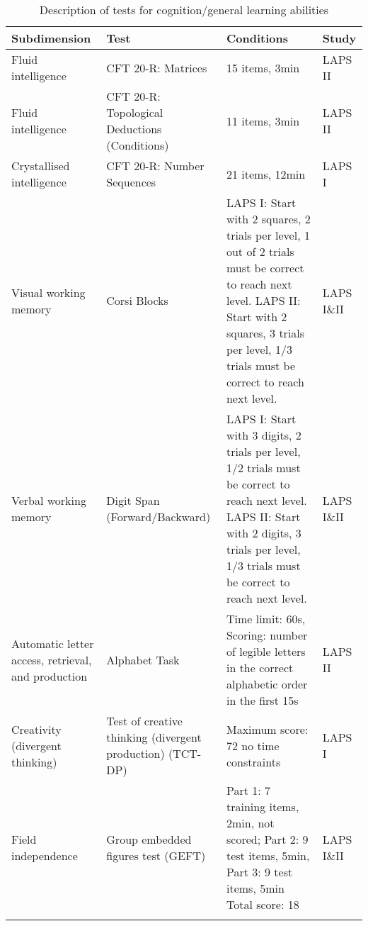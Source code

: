 \documentclass[output=paper]{langsci/langscibook}
\begin{document}
\begin{table}\footnotesize
\begin{tabularx}{\textwidth}{QQQl}
\lsptoprule
{Subdimension} & {Test} & {Conditions} & {Study}\\\midrule
Fluid intelligence & CFT 20-R: Matrices \citep{Weiss2006} & 15 items, 3min & LAPS II\\
Fluid intelligence & CFT 20-R: Topological Deductions (Conditions) \citep{Weiss2006} & 11 items, 3min & LAPS II\\
Crystallised intelligence & CFT 20-R: Number Sequences \citep{Weiss2006} & 21 items, 12min & LAPS I\\
Visual working memory & Corsi Blocks & LAPS I: Start with 2 squares, 2 trials per level, 1 out of 2 trials must be correct to reach next level. LAPS II: Start with 2 squares, 3 trials per level, 1/3 trials must be correct to reach next level. & LAPS I\&II\\
Verbal working memory & Digit Span (Forward\slash Backward) & LAPS I: Start with 3 digits, 2 trials per level, 1/2 trials must be correct to reach next level. LAPS II: Start with 2 digits, 3 trials per level, 1/3 trials must be correct to reach next level. & LAPS I\&II\\
Automatic letter access, retrieval, and production & Alphabet Task \citep{BerningerEtAl1992} & Time limit: 60s, Scoring: number of legible letters in the correct alphabetic order in the first 15s & LAPS II\\
Creativity (divergent thinking) & Test of creative thinking (divergent production) (TCT-DP) \citep{UrbanJellen1995} & Maximum score: 72 no time constraints & LAPS I\\
Field independence & Group embedded figures test (GEFT) \citep{WitkinEtAl2014} & Part 1: 7 training items, 2min, not scored; Part 2: 9 test items, 5min, Part 3: 9 test items, 5min
Total score: 18 & LAPS I\&II\\
\lspbottomrule
\end{tabularx}
\caption{Description of tests for cognition/general learning abilities}
\end{table}
\end{document}
